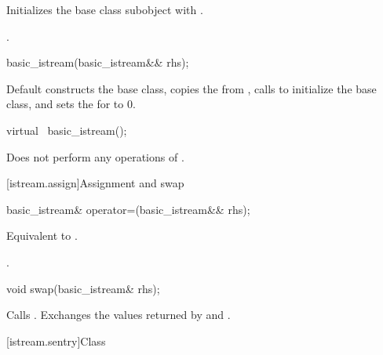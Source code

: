 %
\begin{itemdescr}
\pnum
\effects
Initializes the base class subobject with
.

\pnum
\ensures
{}.
\end{itemdescr}


%
\begin{itemdecl}
basic_istream(basic_istream&& rhs);
\end{itemdecl}

\begin{itemdescr}
\pnum
\effects
Default constructs the base class, copies the
 from , calls
 to initialize the base
class, and sets the  for  to 0.
\end{itemdescr}

%
\begin{itemdecl}
virtual ~basic_istream();
\end{itemdecl}

\begin{itemdescr}
\pnum
\remarks
Does not perform any operations of
.
\end{itemdescr}

[istream.assign]{Assignment and swap}

%
\begin{itemdecl}
basic_istream& operator=(basic_istream&& rhs);
\end{itemdecl}

\begin{itemdescr}
\pnum
\effects
Equivalent to .

\pnum
\returns
{}.
\end{itemdescr}

%
\begin{itemdecl}
void swap(basic_istream& rhs);
\end{itemdecl}

\begin{itemdescr}
\pnum
\effects
Calls .
Exchanges the values returned by  and
.
\end{itemdescr}

[istream.sentry]{Class }


